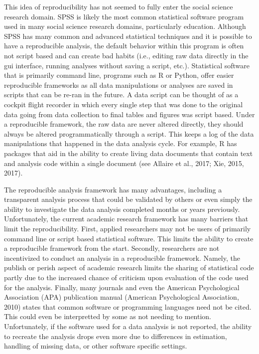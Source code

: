 \documentclass[english,,man]{apa6}
\theoremstyle{definition}
\theoremstyle{definition}
\theoremstyle{definition}
\theoremstyle{remark}
\begin{document}
This idea of reproducibility has not seemed to fully enter the social
science research domain. SPSS is likely the most common statistical
software program used in many social science research domains,
particularly education. Although SPSS has many common and advanced
statistical techniques and it is possible to have a reproducible
analysis, the default behavior within this program is often not script
based and can create bad habits (i.e., editing raw data directly in the
gui interface, running analyses without saving a script, etc.).
Statistical software that is primarily command line, programs such as R
or Python, offer easier reproducible frameworks as all data
manipulations or analyses are saved in scripts that can be re-ran in the
future. A data script can be thought of as a cockpit flight recorder in
which every single step that was done to the original data going from
data collection to final tables and figures was script based. Under a
reproducible framework, the raw data are never altered directly, they
should always be altered programmatically through a script. This keeps a
log of the data manipulations that happened in the data analysis cycle.
For example, R has packages that aid in the ability to create living
data documents that contain text and analysis code within a single
document (see Allaire et al., 2017; Xie, 2015, 2017).

The reproducible analysis framework has many advantages, including a
transparent analysis process that could be validated by others or even
simply the ability to investigate the data analysis completed months or
years previously. Unfortunately, the current academic research framework
has many barriers that limit the reproducibility. First, applied
researchers may not be users of primarily command line or script based
statistical software. This limits the ability to create a reproducible
framework from the start. Secondly, researchers are not incentivized to
conduct an analysis in a reproducible framework. Namely, the publish or
perish aspect of academic research limits the sharing of statistical
code partly due to the increased chance of criticism upon evaluation of
the code used for the analysis. Finally, many journals and even the
American Psychological Association (APA) publication manual (American
Psychological Association, 2010) states that common software or
programming languages need not be cited. This could even be interpretted
by some as not needing to mention. Unfortunately, if the software used
for a data analysis is not reported, the ability to recreate the
analysis drops even more due to differences in estimation, handling of
missing data, or other software specific settings.
\end{document}
